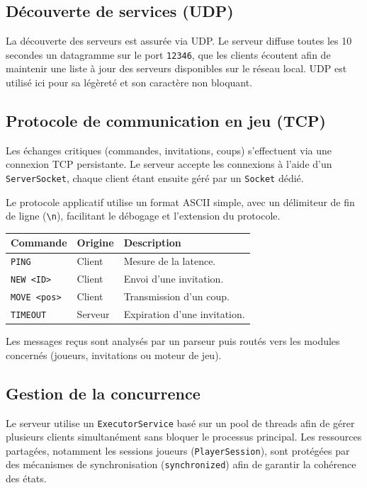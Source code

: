 \documentclass[9pt]{extarticle} %
\begin{document}
\subsection{Découverte de services (UDP)}

La découverte des serveurs est assurée via UDP.  
Le serveur diffuse toutes les 10 secondes un datagramme sur le port \texttt{12346}, que les clients écoutent afin de maintenir une liste à jour des serveurs disponibles sur le réseau local.  
UDP est utilisé ici pour sa légèreté et son caractère non bloquant.

\subsection{Protocole de communication en jeu (TCP)}

Les échanges critiques (commandes, invitations, coups) s’effectuent via une connexion TCP persistante.  
Le serveur accepte les connexions à l’aide d’un \texttt{ServerSocket}, chaque client étant ensuite géré par un \texttt{Socket} dédié.

Le protocole applicatif utilise un format ASCII simple, avec un délimiteur de fin de ligne (\texttt{\textbackslash n}), facilitant le débogage et l’extension du protocole.

\begin{center}
\begin{tabular}{llp{5cm}}
\toprule
Commande & Origine & Description \\
\midrule
\texttt{PING} & Client & Mesure de la latence. \\
\texttt{NEW <ID>} & Client & Envoi d’une invitation. \\
\texttt{MOVE <pos>} & Client & Transmission d’un coup. \\
\texttt{TIMEOUT} & Serveur & Expiration d’une invitation. \\
\bottomrule
\end{tabular}
\end{center}

Les messages reçus sont analysés par un parseur puis routés vers les modules concernés (joueurs, invitations ou moteur de jeu).

\subsection{Gestion de la concurrence}

Le serveur utilise un \texttt{ExecutorService} basé sur un pool de threads afin de gérer plusieurs clients simultanément sans bloquer le processus principal.  
Les ressources partagées, notamment les sessions joueurs (\texttt{PlayerSession}), sont protégées par des mécanismes de synchronisation (\texttt{synchronized}) afin de garantir la cohérence des états.
\end{document}
